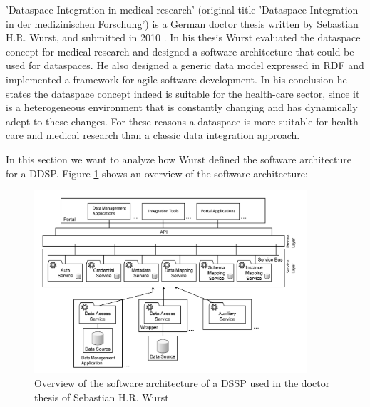 'Dataspace Integration in medical research' (original title 'Dataspace Integration in der medizinischen Forschung') is a German doctor thesis written by Sebastian H.R. Wurst, and submitted in 2010 \cite{WurstDiss}. In his thesis Wurst evaluated the dataspace concept  for medical research and designed a software architecture that could be used for dataspaces. He also designed a generic data model expressed in RDF and implemented a framework for agile software development. 
In his conclusion he states the dataspace concept indeed is suitable for the health-care sector, since it is a heterogeneous environment that is constantly changing and has dynamically adept to these changes. For these reasons a dataspace is more suitable for health-care and medical research than a classic data integration approach.

In this section we want to analyze how Wurst defined the software architecture for a DDSP. Figure \ref{SoftwareArchitectureDSSPWurst} shows an overview of the software architecture:

\begin{figure}[H]
	\begin{center}
		\includegraphics[width=0.9\textwidth]{figures/DataspaceIntegrationInDerMedForschungFigure31.PNG}
	\end{center}
	\caption{Overview of the software architecture of a DSSP used in the doctor thesis of Sebastian H.R. Wurst \cite[p. 117, Figure 31, english translation]{WurstDiss}}
	\label{SoftwareArchitectureDSSPWurst}
\end{figure}

